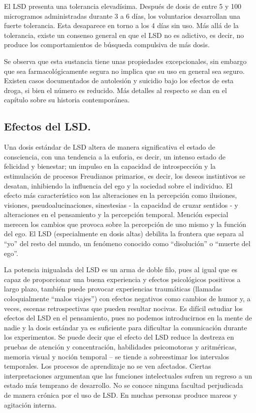 El LSD presenta una tolerancia elevadísima. Después de dosis de entre 5 y 100 microgramos administradas durante 3 a 6 días, los voluntarios desarrollan una fuerte tolerancia. Esta desaparece en torno a los 4 días sin uso. Más allá de la tolerancia, existe un consenso general en que el LSD no es adictivo, es decir, no produce los comportamientos de búsqueda compulsiva de más dosis.

Se observa que esta sustancia tiene unas propiedades excepcionales, sin embargo que sea farmacológicamente segura no implica que su uso en general sea seguro. Existen casos documentados de autolesión y suicidio bajo los efectos de esta droga, si bien el número es reducido. Más detalles al respecto se dan en el capítulo sobre su historia contemporánea.

\subsection{Efectos del LSD.}

Una dosis estándar de LSD altera de manera significativa el estado de consciencia, con una tendencia a la euforia, es decir, un intenso estado de felicidad y bienestar; un impulso en la capacidad de introspección y la estimulación de procesos Freudianos primarios, es decir, los deseos instintivos se desatan, inhibiendo la influencia del ego y la sociedad sobre el individuo. El efecto más característico son las alteraciones en la percepción como ilusiones, visiones, pseudoalucinaciones, sinestesias - la capacidad de cruzar sentidos - y alteraciones en el pensamiento y la percepción temporal. Mención especial merecen los cambios que provoca sobre la percepción de uno mismo y la función del ego. El LSD (especialmente en dosis altas) debilita la frontera que separa al \enquote{yo} del resto del mundo, un fenómeno conocido como \enquote{disolución} o \enquote{muerte del ego}.

La potencia inigualada del LSD es un arma de doble filo, pues al igual que es capaz de proporcionar una buena experiencia y efectos psicológicos positivos a largo plazo, también puede provocar experiencias traumáticas (llamadas coloquialmente \enquote{malos viajes}) con efectos negativos como cambios de humor y, a veces, escenas retrospectivas que pueden resultar nocivas. Es difícil estudiar los efectos del LSD en el pensamiento, pues no podemos introducirnos en la mente de nadie y la dosis estándar ya es suficiente para dificultar la comunicación durante los experimentos. Se puede decir que el efecto del LSD reduce la destreza en pruebas de atención y concentración, habilidades psicomotoras y aritméricas, memoria visual y noción temporal – se tiende a sobreestimar los intervalos temporales. Los procesos de aprendizaje no se ven afectados. Ciertas interpretaciones argumentan que las funciones intelectuales sufren un regreso a un estado más temprano de desarrollo. No se conoce ninguna facultad perjudicada de manera crónica por el uso de LSD. En muchas personas produce mareos y agitación interna.

